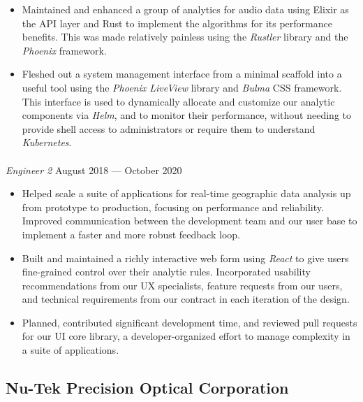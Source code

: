 \documentclass[10pt]{article}
\begin{document}
\begin{itemize}
  \item Maintained and enhanced a group of analytics for audio data using
    Elixir as the API layer and Rust to implement the algorithms for its
    performance benefits. This was made relatively painless using the
    \textit{Rustler} library and the \textit{Phoenix} framework.
  \item Fleshed out a system management interface from a minimal scaffold into
    a useful tool using the \textit{Phoenix LiveView} library and
    \textit{Bulma} CSS framework. This interface is used to dynamically
    allocate and customize our analytic components via \textit{Helm}, and to
    monitor their performance, without needing to provide shell access to
    administrators or require them to understand \textit{Kubernetes}.
\end{itemize}

\paragraph{}
\textit{Engineer 2} \hfill August 2018 --- October 2020

\begin{itemize}
  \item Helped scale a suite of applications for real-time geographic data
    analysis up from prototype to production, focusing on performance and
    reliability. Improved communication between the development team and our
    user base to implement a faster and more robust feedback loop.
  \item Built and maintained a richly interactive web form using \textit{React}
    to give users fine-grained control over their analytic rules. Incorporated
    usability recommendations from our UX specialists, feature requests from
    our users, and technical requirements from our contract in each iteration
    of the design.
  \item Planned, contributed significant development time, and reviewed pull
    requests for our UI core library, a developer-organized effort to manage
    complexity in a suite of applications.
\end{itemize}

\subsection*{Nu-Tek Precision Optical Corporation}
\end{document}

